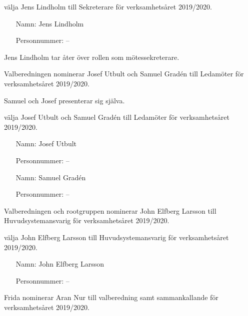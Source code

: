 \documentclass{protokoll}
\begin{document}
\begin{beslut}
  \att välja Jens Lindholm till Sekreterare för verksamhetsåret 2019/2020.
  \begin{itemize}
    \item[Namn: ] Jens Lindholm
    \item[Personnummer: ] \qquad \qquad \qquad \qquad -- \qquad \qquad
  \end{itemize}
\end{beslut}

Jens Lindholm tar åter över rollen som mötessekreterare.

Valberedningen nominerar Josef Utbult och Samuel Gradén till Ledamöter för 
verksamhetsåret 2019/2020.

Samuel och Josef presenterar sig själva.

\begin{beslut}
  \att välja Josef Utbult och Samuel Gradén till Ledamöter för verksamhetsåret
  2019/2020.
  \begin{itemize}
    \item[Namn: ] Josef Utbult
    \item[Personnummer: ] \qquad \qquad \qquad \qquad -- \qquad \qquad
  \end{itemize}
  \begin{itemize}
    \item[Namn: ] Samuel Gradén
    \item[Personnummer: ] \qquad \qquad \qquad \qquad -- \qquad \qquad
  \end{itemize}
\end{beslut}

Valberedningen och rootgruppen nominerar John Elfberg Larsson till
Huvudsystemansvarig för verksamhetsåret 2019/2020.

\begin{beslut}
  \att välja John Elfberg Larsson till Huvudsystemansvarig för verksamhetsåret 
  2019/2020.
  \begin{itemize}
    \item[Namn: ] John Elfberg Larsson 
    \item[Personnummer: ] \qquad \qquad \qquad \qquad -- \qquad \qquad
  \end{itemize}
\end{beslut}

Frida nominerar Aran Nur till valberedning samt sammankallande för
verksamhetsåret 2019/2020. 
\end{document}
